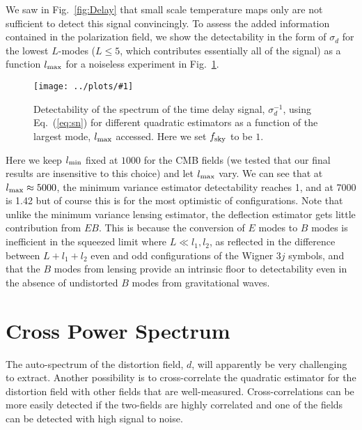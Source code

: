 \documentclass[prd,amsmath,amssymb,floatfix,superscriptaddress,nofootinbib,twocolumn]{revtex4-1}
\newcommand{\ec}[1]{Eq.~(\ref{eq:#1})}
\newcommand{\sfig}[2]{
\texttt{[image: ../plots/\#1]}
        }
\newcommand{\Sfig}[2]{
   \begin{figure}[thbp]
   \begin{center}
    \sfig{#1.pdf}{\columnwidth}
    \caption{{\small #2}}
    \label{fig:#1}
     \end{center}
   \end{figure}
}
\newcommand{\rf}[1]{\ref{fig:#1}}
\begin{document}
We saw in Fig.~\rf{Delay} that small scale temperature maps only are not sufficient to detect this signal convincingly. To assess the added information contained in the polarization field, we show the detectability in the form of $\sigma_d$ for the lowest $L$-modes ($L\leqslant 5$, which contributes essentially all of the signal) as a function $l_{\rm max}$ for a noiseless experiment in Fig.~\rf{StoN}.


\Sfig{StoN}{Detectability of the spectrum of the time delay signal, $\sigma_d^{-1}$, using \ec{sn} for different quadratic estimators as a function of the largest mode, $l_{\rm max}$ accessed. Here we set $f_{\rm sky}$ to be $1$.}

Here we keep $l_{\rm min}$ fixed at $1000$ for the CMB fields (we tested that our final results are insensitive to this choice) and let $l_{\rm max}$ vary.
We can see that at $l_{\rm max} \approx 5000$, the minimum variance estimator detectability reaches 1, and at 7000 is 1.42 but of course this is for the most optimistic of configurations. 
Note that unlike the minimum variance lensing  estimator, the deflection estimator
gets little contribution from $EB$.   This is because the conversion of $E$ modes to $B$
modes is inefficient in the squeezed limit where $L\ll l_1,l_2$, as reflected in the difference between
$L+l_1+l_2$ even and odd configurations of the Wigner 3$j$ symbols, and that the $B$ modes from lensing
provide an intrinsic floor to detectability even in the absence of undistorted $B$ modes
from gravitational waves.



\section{Cross Power Spectrum}
\label{sec:cross}

The auto-spectrum of the distortion field, $d$, will apparently be very challenging to extract. Another possibility is to cross-correlate the quadratic estimator for the distortion field with other fields that are well-measured. Cross-correlations can be more easily detected if the two-fields are highly correlated and one of the fields can be detected with high signal to noise. 
\end{document}
